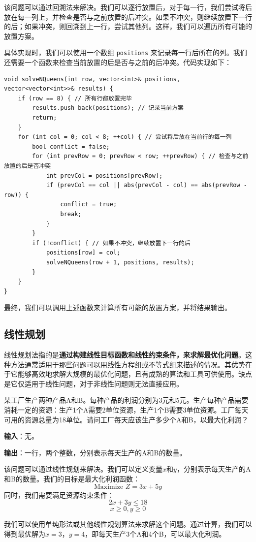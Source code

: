 \begin{answer}
    该问题可以通过回溯法来解决。我们可以逐行放置后，对于每一行，我们尝试将后放在每一列上，并检查是否与之前放置的后冲突。如果不冲突，则继续放置下一行的后；如果冲突，则回溯到上一行，尝试其他列。这样，我们可以遍历所有可能的放置方案。

    具体实现时，我们可以使用一个数组 \texttt{positions} 来记录每一行后所在的列。我们还需要一个函数来检查当前放置的后是否与之前的后冲突。代码实现如下：
\begin{verbatim}
void solveNQueens(int row, vector<int>& positions, vector<vector<int>>& results) {
    if (row == 8) { // 所有行都放置完毕
        results.push_back(positions); // 记录当前方案
        return;
    }
    for (int col = 0; col < 8; ++col) { // 尝试将后放在当前行的每一列
        bool conflict = false;
        for (int prevRow = 0; prevRow < row; ++prevRow) { // 检查与之前放置的后是否冲突
            int prevCol = positions[prevRow];
            if (prevCol == col || abs(prevCol - col) == abs(prevRow - row)) {
                conflict = true;
                break;
            }
        }
        if (!conflict) { // 如果不冲突，继续放置下一行的后
            positions[row] = col;
            solveNQueens(row + 1, positions, results);
        }
    }
}
\end{verbatim}
    最终，我们可以调用上述函数来计算所有可能的放置方案，并将结果输出。
\end{answer}

\subsection{线性规划}

线性规划法指的是\textbf{通过构建线性目标函数和线性约束条件，来求解最优化问题}。这种方法通常适用于那些问题可以用线性方程组或不等式组来描述的情况。其优势在于它能够高效地求解大规模的最优化问题，且有成熟的算法和工具可供使用。缺点是它仅适用于线性问题，对于非线性问题则无法直接应用。

\begin{example}
    某工厂生产两种产品A和B。每种产品的利润分别为3元和5元。生产每种产品需要消耗一定的资源：生产1个A需要2单位资源，生产1个B需要3单位资源。工厂每天可用的资源总量为18单位。请问工厂每天应该生产多少个A和B，以最大化利润？

    \textbf{输入}：无。

    \textbf{输出}：一行，两个整数，分别表示每天生产的A和B的数量。
\end{example}

\begin{answer}
    该问题可以通过线性规划来解决。我们可以定义变量$x$和$y$，分别表示每天生产的A和B的数量。我们的目标是最大化利润函数：
    $$\text{Maximize } Z = 3x + 5y$$
    同时，我们需要满足资源约束条件：
    $$2x + 3y \leq 18$$
    $$x \geq 0, y \geq 0$$

    我们可以使用单纯形法或其他线性规划算法来求解这个问题。通过计算，我们可以得到最优解为$x=3$，$y=4$，即每天生产3个A和4个B，可以最大化利润。
\end{answer}


